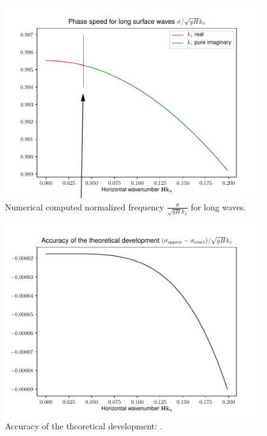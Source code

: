\begin{figure}[h]
\centerline{
\includegraphics[width=15cm]{FIGURES/surfacewaves}
}
\caption{Numerical computed normalized frequency $\displaystyle \frac{\sigma}{\sqrt{gH}k_x}$ for long waves.}
\end{figure}
\begin{figure}[h]
\centerline{
\includegraphics[width=15cm]{FIGURES/accuracy_longwaves}
}
\caption{Accuracy of the theoretical development: .}
\end{figure}